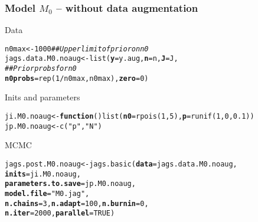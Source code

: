 \documentclass[color=usenames,dvipsnames]{beamer}\usepackage[]{graphicx}\usepackage[]{color}
\makeatletter
\newcommand{\hlnum}[1]{\textcolor[rgb]{0.69,0.494,0}{#1}}%
\newcommand{\hlstr}[1]{\textcolor[rgb]{0.749,0.012,0.012}{#1}}%
\newcommand{\hlcom}[1]{\textcolor[rgb]{0.514,0.506,0.514}{\textit{#1}}}%
\newcommand{\hlopt}[1]{\textcolor[rgb]{0,0,0}{#1}}%
\newcommand{\hlstd}[1]{\textcolor[rgb]{0,0,0}{#1}}%
\newcommand{\hlkwa}[1]{\textcolor[rgb]{0,0,0}{\textbf{#1}}}%
\newcommand{\hlkwb}[1]{\textcolor[rgb]{0,0.341,0.682}{#1}}%
\newcommand{\hlkwc}[1]{\textcolor[rgb]{0,0,0}{\textbf{#1}}}%
\newcommand{\hlkwd}[1]{\textcolor[rgb]{0.004,0.004,0.506}{#1}}%
\newenvironment{kframe}{%
 \def\at@end@of@kframe{}%
 \ifinner\ifhmode%
  \def\at@end@of@kframe{\end{minipage}}%
  \begin{minipage}{\columnwidth}%
 \fi\fi%
 \def\FrameCommand##1{\hskip\@totalleftmargin \hskip-\fboxsep
 \colorbox{shadecolor}{##1}\hskip-\fboxsep
     \hskip-\linewidth \hskip-\@totalleftmargin \hskip\columnwidth}%
 \MakeFramed {\advance\hsize-\width
   \@totalleftmargin\z@ \linewidth\hsize
   \@setminipage}}%
 {\par\unskip\endMakeFramed%
 \at@end@of@kframe}
\newenvironment{knitrout}{}{} %
\makeatother
\begin{document}
\begin{frame}[fragile]
  \frametitle{Model $M_0$ -- without data augmentation}
  Data
\begin{knitrout}\scriptsize
{}\color{fgcolor}\begin{kframe}
\begin{alltt}
\hlstd{n0max} \hlkwb{<-} \hlnum{1000}  \hlcom{## Upper limit of prior on n0}
\hlstd{jags.data.M0.noaug} \hlkwb{<-} \hlkwd{list}\hlstd{(}\hlkwc{y}\hlstd{=y.aug,} \hlkwc{n}\hlstd{=n,} \hlkwc{J}\hlstd{=J,}
                           \hlcom{## Prior probs for n0}
                           \hlkwc{n0probs}\hlstd{=}\hlkwd{rep}\hlstd{(}\hlnum{1}\hlopt{/}\hlstd{n0max, n0max),} \hlkwc{zero}\hlstd{=}\hlnum{0}\hlstd{)}
\end{alltt}
\end{kframe}
\end{knitrout}
\pause
\vfill
  Inits and parameters
\begin{knitrout}\scriptsize
{}\color{fgcolor}\begin{kframe}
\begin{alltt}
\hlstd{ji.M0.noaug} \hlkwb{<-} \hlkwa{function}\hlstd{()} \hlkwd{list}\hlstd{(}\hlkwc{n0}\hlstd{=}\hlkwd{rpois}\hlstd{(}\hlnum{1}\hlstd{,} \hlnum{5}\hlstd{),} \hlkwc{p}\hlstd{=}\hlkwd{runif}\hlstd{(}\hlnum{1}\hlstd{,} \hlnum{0}\hlstd{,} \hlnum{0.1}\hlstd{))}
\hlstd{jp.M0.noaug} \hlkwb{<-} \hlkwd{c}\hlstd{(}\hlstr{"p"}\hlstd{,} \hlstr{"N"}\hlstd{)}
\end{alltt}
\end{kframe}
\end{knitrout}
\pause
\vfill
MCMC
\begin{knitrout}\scriptsize
{}\color{fgcolor}\begin{kframe}
\begin{alltt}
\hlstd{jags.post.M0.noaug} \hlkwb{<-} \hlkwd{jags.basic}\hlstd{(}\hlkwc{data}\hlstd{=jags.data.M0.noaug,}
                                 \hlkwc{inits}\hlstd{=ji.M0.noaug,}
                                 \hlkwc{parameters.to.save}\hlstd{=jp.M0.noaug,}
                                 \hlkwc{model.file}\hlstd{=}\hlstr{"M0.jag"}\hlstd{,}
                                 \hlkwc{n.chains}\hlstd{=}\hlnum{3}\hlstd{,} \hlkwc{n.adapt}\hlstd{=}\hlnum{100}\hlstd{,} \hlkwc{n.burnin}\hlstd{=}\hlnum{0}\hlstd{,}
                                 \hlkwc{n.iter}\hlstd{=}\hlnum{2000}\hlstd{,} \hlkwc{parallel}\hlstd{=}\hlnum{TRUE}\hlstd{)}
\end{alltt}
\end{kframe}
\end{knitrout}
\end{frame}
\end{document}
